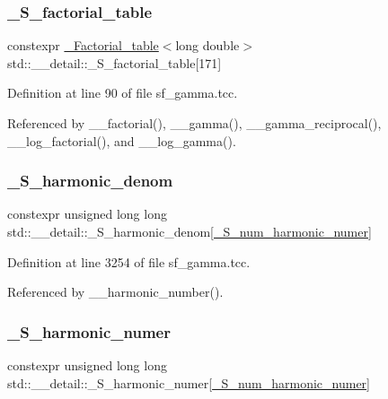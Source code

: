 \subsubsection{\texorpdfstring{\+\_\+\+S\+\_\+factorial\+\_\+table}{\_S\_factorial\_table}}
{\footnotesize\ttfamily constexpr \hyperlink{structstd_1_1____detail_1_1__Factorial__table}{\+\_\+\+Factorial\+\_\+table}$<$long double$>$ std\+::\+\_\+\+\_\+detail\+::\+\_\+\+S\+\_\+factorial\+\_\+table\mbox{[}171\mbox{]}}



Definition at line 90 of file sf\+\_\+gamma.\+tcc.



Referenced by \+\_\+\+\_\+factorial(), \+\_\+\+\_\+gamma(), \+\_\+\+\_\+gamma\+\_\+reciprocal(), \+\_\+\+\_\+log\+\_\+factorial(), and \+\_\+\+\_\+log\+\_\+gamma().

\mbox{\label{namespacestd_1_1____detail_ad2bdb66d93fa4433097b287c7899cd1e}} 
\subsubsection{\texorpdfstring{\+\_\+\+S\+\_\+harmonic\+\_\+denom}{\_S\_harmonic\_denom}}
{\footnotesize\ttfamily constexpr unsigned long long std\+::\+\_\+\+\_\+detail\+::\+\_\+\+S\+\_\+harmonic\+\_\+denom\mbox{[}\hyperlink{namespacestd_1_1____detail_a554788747841f6abbfd7572673df32ad}{\+\_\+\+S\+\_\+num\+\_\+harmonic\+\_\+numer}\mbox{]}}



Definition at line 3254 of file sf\+\_\+gamma.\+tcc.



Referenced by \+\_\+\+\_\+harmonic\+\_\+number().

\mbox{\label{namespacestd_1_1____detail_a3976bb1731d7ecfaba4601d1083d7cf6}} 
\subsubsection{\texorpdfstring{\+\_\+\+S\+\_\+harmonic\+\_\+numer}{\_S\_harmonic\_numer}}
{\footnotesize\ttfamily constexpr unsigned long long std\+::\+\_\+\+\_\+detail\+::\+\_\+\+S\+\_\+harmonic\+\_\+numer\mbox{[}\hyperlink{namespacestd_1_1____detail_a554788747841f6abbfd7572673df32ad}{\+\_\+\+S\+\_\+num\+\_\+harmonic\+\_\+numer}\mbox{]}}



